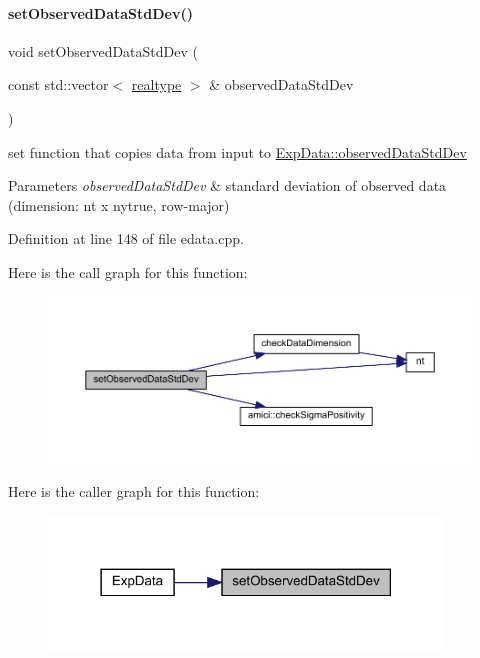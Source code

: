 \paragraph{\texorpdfstring{setObservedDataStdDev()}{setObservedDataStdDev()}\hspace{0.1cm}{\footnotesize\ttfamily [1/4]}}
{\footnotesize\ttfamily void set\+Observed\+Data\+Std\+Dev (\begin{DoxyParamCaption}\item[{const std\+::vector$<$ \mbox{\hyperlink{namespaceamici_a1bdce28051d6a53868f7ccbf5f2c14a3}{realtype}} $>$ \&}]{observed\+Data\+Std\+Dev }\end{DoxyParamCaption})}

set function that copies data from input to \mbox{\hyperlink{classamici_1_1_exp_data_aa097568cebb4be48c4c1dfaab0c2a159}{Exp\+Data\+::observed\+Data\+Std\+Dev}}


\begin{DoxyParams}{Parameters}
{\em observed\+Data\+Std\+Dev} & standard deviation of observed data (dimension\+: nt x nytrue, row-\/major) \\
\hline
\end{DoxyParams}


Definition at line 148 of file edata.\+cpp.

Here is the call graph for this function\+:
\nopagebreak
\begin{figure}[H]
\begin{center}
\leavevmode
\includegraphics[width=350pt]{classamici_1_1_exp_data_a5d84a162eb705e032820acd004603f29_cgraph}
\end{center}
\end{figure}
Here is the caller graph for this function\+:
\nopagebreak
\begin{figure}[H]
\begin{center}
\leavevmode
\includegraphics[width=297pt]{classamici_1_1_exp_data_a5d84a162eb705e032820acd004603f29_icgraph}
\end{center}
\end{figure}
\mbox{\label{classamici_1_1_exp_data_ae6ed832b9bee1861d233c90d5a37c677}} 
